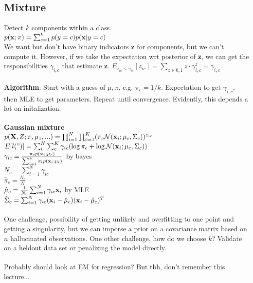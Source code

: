 \subsection{Mixture}
\underline{Detect $k$ components within a class}.\\
$p({\textrm{\textbf{x}}}; \pi) = \sum_{c=1}^{k}p(y=c)p({\textrm{\textbf{x}}}|y=c)$\\
We want but don't have binary indicators \textbf{z} for components, but we can't compute it. However, if we take the expectation wrt posterior of \textbf{z}, we can get the responsibilities $\gamma_{i,c}$ that estimate \textbf{z}. $E_{z_{ic}\sim \gamma_{ic}}[z_{ic}] = \sum_{z\in 0,1}z\cdot \gamma_{i,c}^{z} = \gamma_{i,c}$.\\\\
\textbf{Algorithm}: Start with a guess of $\mu, \pi$, e.g. $\pi_c = 1/k$. Expectation to get $\gamma_{i,c}$, then MLE to get parameters. Repeat until convergence. Evidently, this depends a lot on initalization.\\\\
\textbf{Gaussian mixture}\\
$p({\textrm{\textbf{X}}}, Z; \pi, \mu_1,...) = \prod_{i=1}^{N}\prod_{c=1}^{K}(\pi_c \mathcal{N}({\textrm{\textbf{x}}}_i; \mu_c, \Sigma_c))^{z_{ic}}$\\
$E[l(")] = \sum_{i}^{N}\sum_{c}^{K}\gamma_{ic}(\log \pi_c + \log \mathcal{N}({\textrm{\textbf{x}}}_i; \mu_c, \Sigma_c))$\\
$\gamma_{ic} = \frac{\pi_c p({\textrm{\textbf{x}}}_i; \mu_c)}{\sum_{l=1}^{k}\pi_l p({\textrm{\textbf{x}}}_i; \mu_l)}$ by bayes\\
$N_c = \sum_{i=1}^{N}\gamma_{ic}$\\
$\hat{\pi}_c = \frac{N_c}{N}$\\
$\hat{\mu}_c = \frac{1}{N_c} \sum_{i=1}^{N}\gamma_{ic}{\textrm{\textbf{x}}}_i$ by MLE\\
$\hat{\Sigma}_c = \sum_{i=1}^N \gamma_{ic}({\textrm{\textbf{x}}}_i - \hat{\mu}_c)({\textrm{\textbf{x}}}_i - \hat{\mu}_c)^{T}$\\\\
One challenge, possibility of getting unlikely and overfitting to one point and getting a singularity, but we can imporse a prior on a covariance matrix based on $n$ hallucinated observations. One other challenge, how do we choose $k$? Validate on a heldout data set or penalizing the model directly.\\\\
Probably should look at EM for regression? But tbh, don't remember this lecture...
